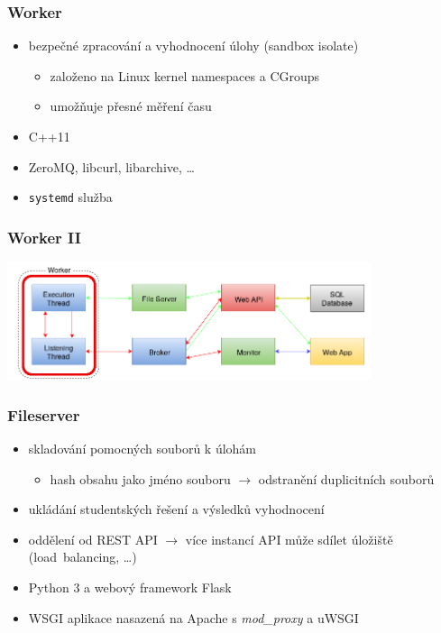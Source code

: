 \documentclass{beamer}
\begin{document}
\begin{frame}
	\frametitle{Worker}
	\begin{itemize}
		\item bezpečné zpracování a vyhodnocení úlohy (sandbox isolate)
			\begin{itemize}
				\item založeno na Linux kernel namespaces a CGroups
				\item umožňuje přesné měření času
			\end{itemize}
		\item C++11
		\item ZeroMQ, libcurl, libarchive, \dots
		\item \texttt{systemd} služba
	\end{itemize}
\end{frame}

\begin{frame}
	\frametitle{Worker II}
	\begin{center}
		\includegraphics[width=0.8\textwidth]{images/communication-worker.png}
	\end{center}
\end{frame}

\begin{frame}
	\frametitle{Fileserver}
	\begin{itemize}
		\item skladování pomocných souborů k úlohám
			\begin{itemize}
				\item hash obsahu jako jméno souboru $\rightarrow$ odstranění duplicitních souborů
			\end{itemize}
		\item ukládání studentských řešení a výsledků vyhodnocení
		\item oddělení od REST API $\rightarrow$ více instancí API může sdílet úložiště (load~balancing, \dots)
		\item Python 3 a webový framework Flask
		\item WSGI aplikace nasazená na Apache s {\it mod\_proxy} a uWSGI
	\end{itemize}
\end{frame}
\end{document}
